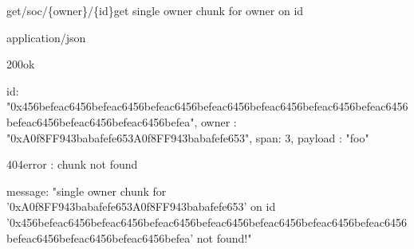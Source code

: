\UseRawInputEncoding
\begin{apiRoute}{get}{/soc/\{owner\}/\{id\}}{get single owner chunk for owner on id}
 {
}
{ }
\begin{routeParameter} 
\end{routeParameter} \begin{routeResponse}{application/json}
\begin{routeResponseItem}{200}{ok} \begin{routeResponseItemBody}
id: "0x456befeac6456befeac6456befeac6456befeac6456befeac6456befeac6456befeac6456befeac6456befeac6456befeac6456befea", owner : "0xA0f8FF943babafefe653A0f8FF943babafefe653", span: 3,  payload : "foo"
\end{routeResponseItemBody} \end{routeResponseItem}
\begin{routeResponseItem}{404}{error : chunk not found}
\begin{routeResponseItemBody} 
message: "single owner chunk for ’0xA0f8FF943babafefe653A0f8FF943babafefe653’ on id '0x456befeac6456befeac6456befeac6456befeac6456befeac6456befeac6456befeac6456befeac6456befeac6456befeac6456befea' not found!"
\end{routeResponseItemBody} \end{routeResponseItem}
\end{routeResponse} \end{apiRoute}